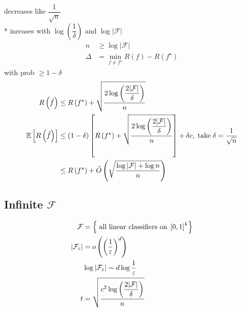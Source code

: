 \documentclass{article}
\begin{document}
decreases like $\dfrac{1}{\sqrt{n}}$
\\* inreases with $\log\left(\dfrac{1}{\delta}\right)$ and $\log | \mathcal{F} |$
\begin{align*}
n  &\geq  \log | \mathcal{F} |
\\ \Delta &= \displaystyle\min_{f \neq  f^\star } R\left(f\right) - R\left(f^\star \right)
\end{align*}
with prob $\geq  1 - \delta$
\begin{align*}
R\left(\hat{f}\right)  &\leq  R\left(f^\star \right) + \sqrt{\dfrac{2 \log\left(\dfrac{2 \mathcal{|F}|}{\delta}\right)}{n}}
\\ \mathbb{E}\left[R\left(\hat{f}\right)\right] &\leq  \left(1 - \delta\right) \left[R\left(f^\star \right) + \sqrt{\dfrac{2 \log\left(\dfrac{2 \mathcal{|F}|}{\delta}\right)}{n}}\right] + \delta c , \text{\;take\;} \delta = \dfrac{1}{\sqrt{n}}
\\ &\leq  R\left(f^\star \right) + \tilde{O}\left(\sqrt{\dfrac{\log \mathcal{|F}| + \log n}{n}}\right)
\end{align*}


\subsection{Infinite $\mathcal{F}$}
\begin{align*}
\mathcal{F} &= \left\{\text{\;all linear classifiers on\;} \left[0, 1\right]^{k}\right\}
\\ | \mathcal{F}_{\varepsilon} | &= o\left(\left(\dfrac{1}{\varepsilon}\right)^{d}\right)
\\ &\log | \mathcal{F}_{\varepsilon} | \sim  d \log \dfrac{1}{\varepsilon}
\\ t  &= \sqrt{\dfrac{c^{2} \log\left(\dfrac{2 \mathcal{|F}|}{\delta}\right)}{n}}
\end{align*}
\end{document}
